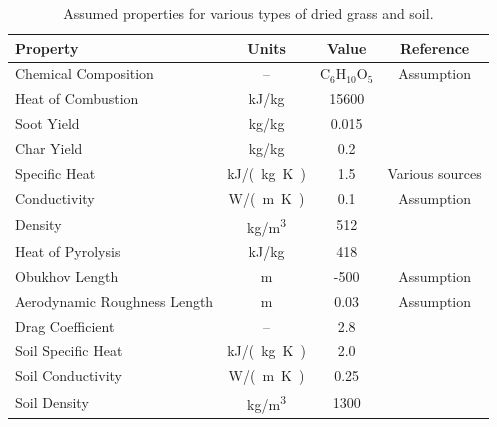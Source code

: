 \begin{table}
\centering
\caption[Assumed properties for dry grass and soil]{Assumed properties for various types of dried grass and soil.}
\label{Assumed_Properties_Grasses}
\begin{tabular}{|l|c|c|c|}
\hline
Property                        & Units                 & Value                     & Reference                             \\ \hline \hline
Chemical Composition            & --                    & C$_6$H$_{10}$O$_5$        & Assumption                            \\ \hline
Heat of Combustion              & kJ/kg                 & 15600                     & \cite{Susott:FS1982}                  \\ \hline
Soot Yield                      & kg/kg                 & 0.015                     & \cite{SFPE:Tewarson}                  \\ \hline
Char Yield                      & kg/kg                 & 0.2                       & \cite{Susott:FS1982}                  \\ \hline
Specific Heat                   & \unit{kJ/(kg.K)}       & 1.5                       & Various sources                       \\ \hline
Conductivity                    & \unit{W/(m.K)}         & 0.1                       & Assumption                            \\ \hline
Density                         & \unit{kg/m^3}              & 512                       & \cite{Rothermel:1972}                 \\ \hline
Heat of Pyrolysis               & kJ/kg                 & 418                       & \cite{Morvan:CF2004}                  \\ \hline
Obukhov Length                  & m                     & -500                      & Assumption                            \\ \hline
Aerodynamic Roughness Length    & m                     & 0.03                      & Assumption                            \\ \hline
Drag Coefficient                & --                    & 2.8                       & \cite{Falkenstein-Smith:2018}         \\ \hline \hline
Soil Specific Heat              & \unit{kJ/(kg.K)}       & 2.0                       & \cite{Farouki:1981}                   \\ \hline
Soil Conductivity               & \unit{W/(m.K)}         & 0.25                      & \cite{Farouki:1981}                   \\ \hline
Soil Density                    & \unit{kg/m^3}              & 1300                      & \cite{Farouki:1981}                   \\ \hline

\end{tabular}
\end{table}


